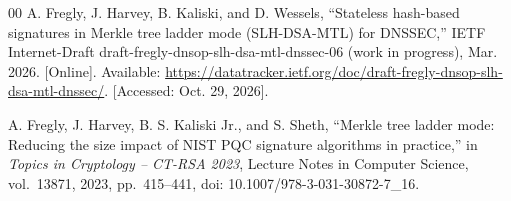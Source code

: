 \documentclass[conference]{IEEEtran}
\begin{document}
\begin{thebibliography}{00}
 A. Fregly, J. Harvey, B. Kaliski, and D. Wessels, ``Stateless hash-based signatures in Merkle tree ladder mode (SLH-DSA-MTL) for DNSSEC,'' IETF Internet-Draft draft-fregly-dnsop-slh-dsa-mtl-dnssec-06 (work in progress), Mar. 2026. [Online]. Available: \url{https://datatracker.ietf.org/doc/draft-fregly-dnsop-slh-dsa-mtl-dnssec/}. [Accessed: Oct. 29, 2026].

 A. Fregly, J. Harvey, B. S. Kaliski Jr., and S. Sheth, ``Merkle tree ladder mode: Reducing the size impact of NIST PQC signature algorithms in practice,'' in \emph{Topics in Cryptology -- CT-RSA 2023}, Lecture Notes in Computer Science, vol.~13871, 2023, pp.~415--441, doi: 10.1007/978-3-031-30872-7\_16.

\end{thebibliography}
\end{document}
